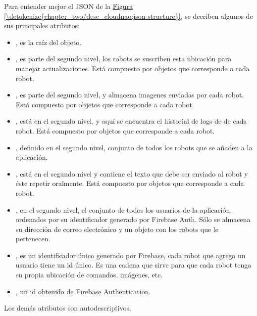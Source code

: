 Para entender mejor el JSON de la \hyperref[\detokenize{chapter_two/desc_cloudnao:json-structure}]{Figura \ref{\detokenize{chapter_two/desc_cloudnao:json-structure}}}, se decriben
algunos de sus principales atributos:
\begin{itemize}
\item {} 
, es la raíz del objeto.

\item {} 
, es parte del segundo nivel, los robots se suscriben esta ubicación para manejar actualizaciones. Está compuesto por objetos que corresponde a cada robot.

\item {} 
, es parte del segundo nivel, y almacena imagenes enviadas por cada robot. Está compuesto por objetos que corresponde a cada robot.

\item {} 
, está en el segundo nivel, y aquí se encuentra el historial de logs de  de cada robot. Está compuesto por objetos que corresponde a cada robot.

\item {} 
, definido en el segundo nivel, conjunto de todos los robots que se añaden a la aplicación.

\item {} 
, está en el segundo nivel y contiene el texto que debe ser enviado al robot y éste repetir oralmente. Está compuesto por objetos que corresponde a cada robot.

\item {} 
, en el segundo nivel, el conjunto de todos los usuarios de la aplicación, ordenados por su identificador generado por Firebase Auth. Sólo se almacena su dirección de correo electrónico y un objeto con los robots que le pertenecen.

\item {} 
, es un identificador único generado por Firebase, cada robot que agrega un usuario tiene un id único. Es una cadena que sirve para que cada robot tenga su propia ubicación de comandos, imágenes, etc.

\item {} 
, un id obtenido de Firebase Authentication.

\end{itemize}

Los demás atributos son autodescriptivos.

